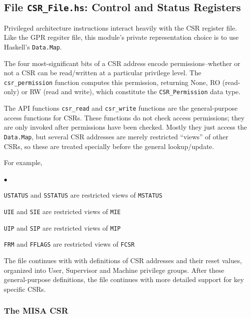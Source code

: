\documentclass[11pt]{article}
\newenvironment{tightlist}%
{\begin{list}{$\bullet$}{%
    \setlength{\topsep}{0in}
    \setlength{\partopsep}{0in}
    \setlength{\itemsep}{0in}
    \setlength{\parsep}{0in}
    \setlength{\leftmargin}{1.5em}
    \setlength{\rightmargin}{0in}
    \setlength{\itemindent}{0in}
}
}%
{\end{list}
}
\begin{document}
\subsection{File {\tt CSR\_File.hs}: Control and Status Registers}

\label{sec_csrs}

Privileged architecture instructions interact heavily with the CSR
register file.  Like the GPR regsiter file, this module's private
representation choice is to use Haskell's \verb|Data.Map|.

The four most-significant bits of a CSR address encode
permissions--whether or not a CSR can be read/written at a particular
privilege level.  The \verb|csr_permission| function computes this
permission, returning None, RO (read-only) or RW (read and write),
which constitute the \verb|CSR_Permission| data type.

The API functions \verb|csr_read| and \verb|csr_write| functions are
the general-purpose access functions for CSRs.  These functions do not
check access permissions; they are only invoked after permissions have
been checked.  Mostly they just access the \verb|Data.Map|, but
several CSR addresses are merely restricted ``views'' of other CSRs,
so these are treated specially before the general lookup/update.

For example,
\begin{tightlist}
\item
\verb|USTATUS| and \verb|SSTATUS| are restricted views of \verb|MSTATUS|

\item
\verb|UIE| and \verb|SIE| are restricted views of \verb|MIE|

\item
\verb|UIP| and \verb|SIP| are restricted views of \verb|MIP|

\item
\verb|FRM| and \verb|FFLAGS| are restricted views of \verb|FCSR|
\end{tightlist}

The file continues with with definitions of CSR addresses and their
reset values, organized into User, Supervisor and Machine privilege
groups.  After these general-purpose definitions, the file continues
with more detailed support for key specific CSRs.


\subsubsection{The MISA CSR}
\end{document}
